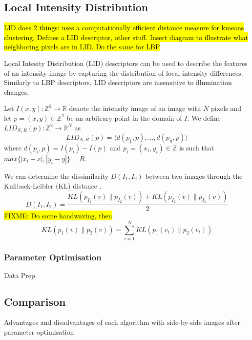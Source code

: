 \documentclass{article}
\begin{document}
\subsection{Local Intensity Distribution}
\hl{LID does 2 things: uses a computationally efficient distance measure for kmeans clustering, Defines a LID descriptor, other stuff. Insert diagram to illustrate what neighboring pixels are in LID. Do the same for LBP}

Local Intesity Distribution (LID) descriptors can be used to describe the features of an intensity image by capturing the distribution of local intensity differences. Similarly to LBP descriptors, LID descriptors are insensitive to illumination changes.

Let $I(x,y) : \mathbb{Z}^2 \rightarrow \mathbb{R}$ denote the intensity image of an image with $N$ pixels and let $p = (x,y) \in \mathbb{Z}^2$ be an arbitrary point in the domain of $I$. We define $LID_{N,R}(p) : \mathbb{Z}^2 \rightarrow \mathbb{R}^N$ as
\begin{equation}
   LID_{N,R}(p) = \langle d(p_1,p), \ldots, d(p_n,p)\rangle
\end{equation}
where $d(p_i,p) = I(p_i) - I(p)$ and $p_i = (x_i, y_i) \in \mathbb{Z}$ is such that $max\{|x_i - x|, |y_i - y|\} = R$. %

We can determine the dissimilarity $D(I_1, I_2)$ between two images through the Kullback-Leibler (KL) distance \cite{kullback1951information}.
\begin{equation}
	D(I_1, I_2) = \frac{KL\left(p_{I_1}(v) \| p_{I_2}(v)\right) +
	              KL\left(p_{I_2}(v) \| p_{I_1}(v)\right)}{2}
\end{equation}
\hl{FIXME: Do some handwaving, then}
\begin{equation}
	KL(p_1(v) \| p_2(v)) = \sum_{i=1}^{N}KL(p_1(v_i) \| p_2(v_i))
\end{equation}

\subsubsection{Parameter Optimisation}
Data Prep

\subsection{Comparison}
Advantages and disadvantages of each algorithm with side-by-side images after parameter optimisation
\end{document}
